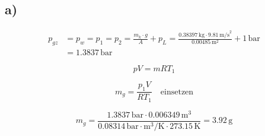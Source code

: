 

\subsection*{a)}
\begin{align*}
    p_{gz} &= p_{w} = p_{1} = p_{2} = \frac{m_{k} \cdot g}{A} + p_{L} = \frac{0.38397 \, \text{kg} \cdot 9.81 \, \text{m/s}^2}{0.00485 \, \text{m}^2} + 1 \, \text{bar} \\
    &= 1.3837 \, \text{bar}
\end{align*}

\[
pV = mRT_{1}
\]

\[
m_{g} = \frac{p_{1}V}{RT_{1}} \quad \text{einsetzen}
\]

\[
m_{g} = \frac{1.3837 \, \text{bar} \cdot 0.006349 \, \text{m}^3}{0.08314 \, \text{bar} \cdot \text{m}^3/\text{K} \cdot 273.15 \, \text{K}} = 3.92 \, \text{g}
\]